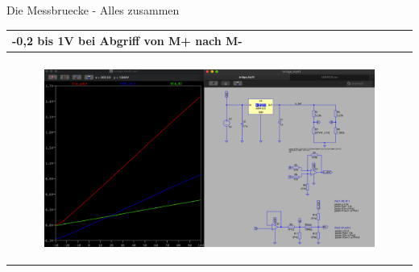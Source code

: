 \begin{frame}[t]{Die Messbruecke - Alles zusammen}

    \begin{spacing}{0.9} \begin{tiny}
            \begin{table}[h!]
                \begin{tabular}{p{10cm} }
                    \hline
                    \textbf{-0,2 bis 1V bei Abgriff von M+ nach M-} \\
                    \hline                                          \\
                    \begin{minipage}{\textwidth}
                        \begin{figure}
                            \includegraphics[width=\linewidth]{pictures/complete.png}
                        \end{figure}
                    \end{minipage}
                \end{tabular}

            \end{table}

        \end{tiny} \end{spacing}

\end{frame}
